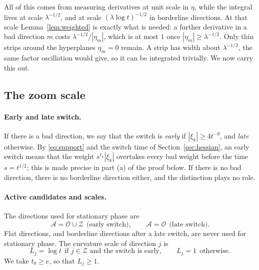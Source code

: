 \documentclass[11pt]{article}
\theoremstyle{remark}
\begin{document}
All of this comes from measuring derivatives at unit scale in $\eta$, while the
integral lives at scale $\lambda^{-1/2}$, and at scale $(\lambda\log t)^{-1/2}$ in
borderline directions. At that scale Lemma~\ref{lem:weighted} is exactly what is
needed: a further derivative in a bad direction $m$ costs $\lambda^{-1/2}/|\eta_m|$,
which is at most $1$ once $|\eta_m|\ge\lambda^{-1/2}$. Only thin strips around the
hyperplanes $\eta_m=0$ remain. A strip has width about $\lambda^{-1/2}$, the same
factor oscillation would give, so it can be integrated trivially. We now carry this
out.

\subsection{The zoom scale}\label{sec:zoom}

\paragraph{Early and late switch.} If there is a bad direction, we say that the
switch is \emph{early} if $|\xi_k|\ge4t^{-\theta}$, and \emph{late} otherwise. By
\eqref{eq:support} and the switch time of Section~\ref{sec:hessian}, an early switch
means that the weight $s^{\ell_k}|\xi_k|$ overtakes every bad weight before the time
$s=t^{1/2}$; this is made precise in part (a) of the proof below. If there is no bad
direction, there is no borderline direction either, and the distinction plays no
role.

\paragraph{Active candidates and scales.} The directions used for stationary phase
are
\[
\mathcal A=\mathcal O\cup\mathcal Z\ \ \text{(early switch)},\qquad
\mathcal A=\mathcal O\ \ \text{(late switch)}.
\]
Flat directions, and borderline directions after a late switch, are never used for
stationary phase. The curvature scale of direction $j$ is
\[
L_j=\log t\ \ \text{if $j\in\mathcal Z$ and the switch is early},\qquad
L_j=1\ \ \text{otherwise}.
\]
We take $t_0\ge e$, so that $L_j\ge1$.
\end{document}
